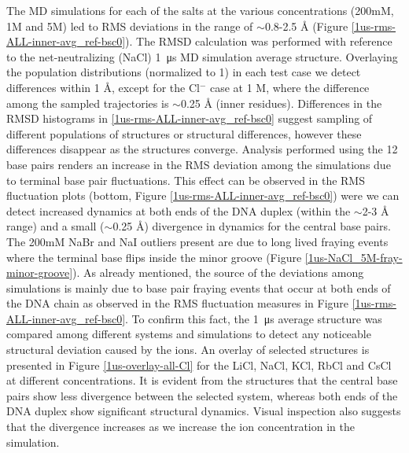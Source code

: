 \documentclass[9pt,lessons]{livecoms}
\begin{document}
The MD simulations for each of the salts at the various concentrations
(200mM, 1M and 5M) led to RMS deviations in the range of $\sim$0.8-2.5 Å
(Figure \ref{1us-rms-ALL-inner-avg_ref-bsc0}). The RMSD calculation
was performed with reference to the net-neutralizing (NaCl)
\SI{1}{\micro\second} MD simulation average structure. Overlaying the
population distributions (normalized to 1) in each test
case we detect differences within 1 Å, except for the Cl$^{-}$ case at
1 M, where the difference among the sampled trajectories is $\sim$0.25 Å
(inner residues). Differences in the RMSD histograms in \ref{1us-rms-ALL-inner-avg_ref-bsc0} suggest sampling of different populations of structures or structural differences, however these differences disappear as the structures converge. Analysis performed using the 12 base pairs renders
an increase in the RMS deviation among the simulations due to terminal
base pair fluctuations.  This effect can be observed in the RMS
fluctuation plots (bottom, Figure
\ref{1us-rms-ALL-inner-avg_ref-bsc0}) were we can detect increased
dynamics at both ends of the DNA duplex (within the $\sim$2-3 Å range) and
a small ($\sim$0.25 Å) divergence in dynamics for the central base
pairs. The 200mM NaBr and NaI outliers present are due to long lived
fraying events where the terminal base flips inside the minor
groove (Figure \ref{1us-NaCl_5M-fray-minor-groove}). As already
mentioned, the source of the deviations among simulations is mainly
due to base pair fraying events that occur at both ends of the DNA
chain as observed in the RMS fluctuation measures in Figure
\ref{1us-rms-ALL-inner-avg_ref-bsc0}. To confirm this fact, the
\SI{1}{\micro\second} average structure was compared among different
systems and simulations to detect any noticeable structural deviation
caused by the ions.  An overlay of selected structures is presented in
Figure \ref{1us-overlay-all-Cl} for the LiCl, NaCl, KCl, RbCl and CsCl
at different concentrations. It is evident from the structures that
the central base pairs show less divergence between the selected
system, whereas both ends of the DNA duplex show significant
structural dynamics. Visual inspection also suggests that the
divergence increases as we increase the ion concentration in the
simulation.
\end{document}
